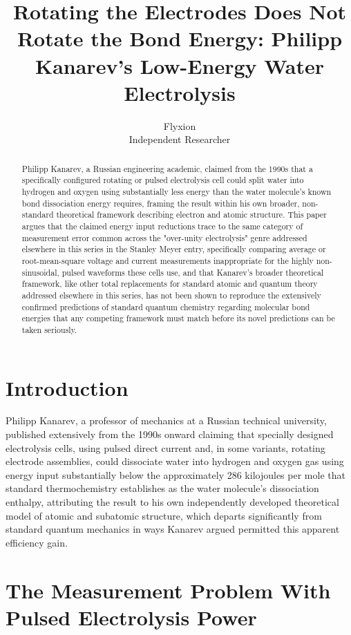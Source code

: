 \documentclass[11pt]{article}
\title{Rotating the Electrodes Does Not Rotate the Bond Energy: Philipp Kanarev's Low-Energy Water Electrolysis}
\author{Flyxion \\ \small Independent Researcher}
\date{}
\begin{document}
\maketitle

\begin{abstract}
Philipp Kanarev, a Russian engineering academic, claimed from the 1990s that a specifically configured rotating or pulsed electrolysis cell could split water into hydrogen and oxygen using substantially less energy than the water molecule's known bond dissociation energy requires, framing the result within his own broader, non-standard theoretical framework describing electron and atomic structure. This paper argues that the claimed energy input reductions trace to the same category of measurement error common across the "over-unity electrolysis" genre addressed elsewhere in this series in the Stanley Meyer entry, specifically comparing average or root-mean-square voltage and current measurements inappropriate for the highly non-sinusoidal, pulsed waveforms these cells use, and that Kanarev's broader theoretical framework, like other total replacements for standard atomic and quantum theory addressed elsewhere in this series, has not been shown to reproduce the extensively confirmed predictions of standard quantum chemistry regarding molecular bond energies that any competing framework must match before its novel predictions can be taken seriously.
\end{abstract}

\section{Introduction}

Philipp Kanarev, a professor of mechanics at a Russian technical university, published extensively from the 1990s onward claiming that specially designed electrolysis cells, using pulsed direct current and, in some variants, rotating electrode assemblies, could dissociate water into hydrogen and oxygen gas using energy input substantially below the approximately 286 kilojoules per mole that standard thermochemistry establishes as the water molecule's dissociation enthalpy, attributing the result to his own independently developed theoretical model of atomic and subatomic structure, which departs significantly from standard quantum mechanics in ways Kanarev argued permitted this apparent efficiency gain.

\section{The Measurement Problem With Pulsed Electrolysis Power}
\end{document}
